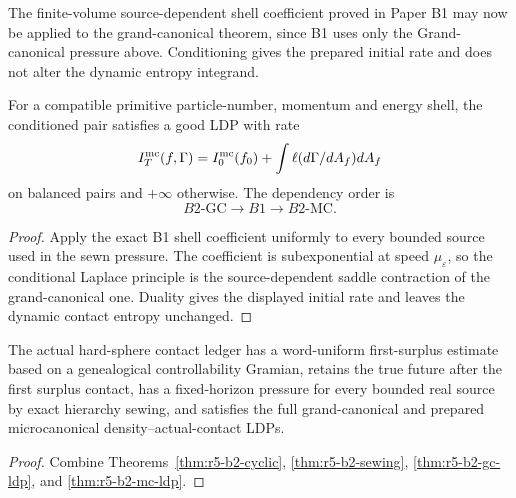 The finite-volume source-dependent shell coefficient proved in Paper B1 may
now be applied to the grand-canonical theorem, since B1 uses only the
Grand-canonical pressure above.  Conditioning gives the prepared initial rate
and does not alter the dynamic entropy integrand.

\begin{theorem}
\label{thm:r5-b2-mc-ldp}
For a compatible primitive particle-number, momentum and energy shell, the
conditioned pair satisfies a good LDP with rate
\[
 I_T^{\rm mc}(f,\Gamma)=I_0^{\rm mc}(f_0)+
 \int\ell(d\Gamma/dA_f)dA_f
\]
on balanced pairs and \(+\infty\) otherwise.  The dependency order is
\[
 B2\text{-GC}\longrightarrow B1\longrightarrow B2\text{-MC}.
\]
\end{theorem}

\begin{proof}
Apply the exact B1 shell coefficient uniformly to every bounded source used in
the sewn pressure.  The coefficient is subexponential at speed
\(\mu_\varepsilon\), so the conditional Laplace principle is the
source-dependent saddle contraction of the grand-canonical one.  Duality gives
the displayed initial rate and leaves the dynamic contact entropy unchanged.
\end{proof}

\begin{theorem}
\label{thm:r5-b2-main}
The actual hard-sphere contact ledger has a word-uniform first-surplus estimate
based on a genealogical controllability Gramian, retains the true future after
the first surplus contact, has a fixed-horizon pressure for every bounded real
source by exact hierarchy sewing, and satisfies the full grand-canonical and
prepared microcanonical density--actual-contact LDPs.
\end{theorem}

\begin{proof}
Combine Theorems~\ref{thm:r5-b2-cyclic},
\ref{thm:r5-b2-sewing}, \ref{thm:r5-b2-gc-ldp}, and
\ref{thm:r5-b2-mc-ldp}.
\end{proof}
